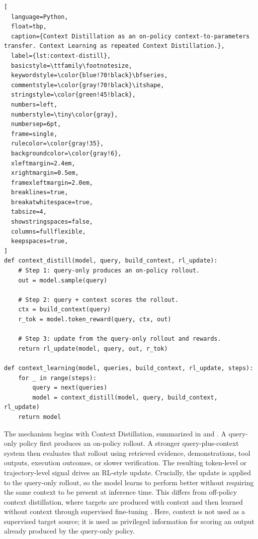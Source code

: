 \begin{lstlisting}[
  language=Python,
  float=tbp,
  caption={Context Distillation as an on-policy context-to-parameters transfer. Context Learning as repeated Context Distillation.},
  label={lst:context-distill},
  basicstyle=\ttfamily\footnotesize,
  keywordstyle=\color{blue!70!black}\bfseries,
  commentstyle=\color{gray!70!black}\itshape,
  stringstyle=\color{green!45!black},
  numbers=left,
  numberstyle=\tiny\color{gray},
  numbersep=6pt,
  frame=single,
  rulecolor=\color{gray!35},
  backgroundcolor=\color{gray!6},
  xleftmargin=2.4em,
  xrightmargin=0.5em,
  framexleftmargin=2.0em,
  breaklines=true,
  breakatwhitespace=true,
  tabsize=4,
  showstringspaces=false,
  columns=fullflexible,
  keepspaces=true,
]
def context_distill(model, query, build_context, rl_update):
    # Step 1: query-only produces an on-policy rollout.
    out = model.sample(query)

    # Step 2: query + context scores the rollout.
    ctx = build_context(query)
    r_tok = model.token_reward(query, ctx, out)

    # Step 3: update from the query-only rollout and rewards.
    return rl_update(model, query, out, r_tok)

def context_learning(model, queries, build_context, rl_update, steps):
    for _ in range(steps):
        query = next(queries)
        model = context_distill(model, query, build_context, rl_update)
    return model
\end{lstlisting}

The mechanism begins with Context Distillation, summarized in  and . A query-only policy first produces an on-policy rollout. A stronger query-plus-context system then evaluates that rollout using retrieved evidence, demonstrations, tool outputs, execution outcomes, or slower verification. The resulting token-level or trajectory-level signal drives an RL-style update. Crucially, the update is applied to the query-only rollout, so the model learns to perform better without requiring the same context to be present at inference time. This differs from off-policy context distillation, where targets are produced with context and then learned without context through supervised fine-tuning \citep{snell2022distillingcontext}. Here, context is not used as a supervised target source; it is used as privileged information for scoring an output already produced by the query-only policy.

